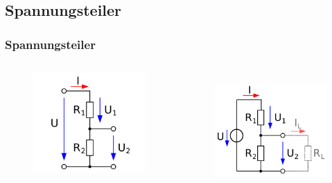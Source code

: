 \subsection{Spannungsteiler}
\begin{frame}
  \frametitle{Spannungsteiler}
  \begin{columns}
    \begin{figure}
      \includegraphics[width=\textwidth,height=.55\textheight,keepaspectratio]{a02/spannungsteiler-unbelastet.png}
    \end{figure}
    \begin{figure}
      \includegraphics[width=\textwidth,height=.55\textheight,keepaspectratio]{a02/spannungsteiler-belastet.png}\\

\end{figure}
\end{columns}
\end{frame}

